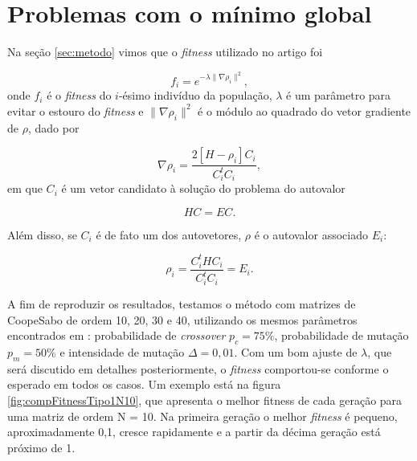 \section{Problemas com o mínimo global}	
	
	Na seção \ref{sec:metodo} vimos que o \textit{fitness} utilizado no artigo \cite{metodo2004}  foi
	
	\begin{equation}
		\label{eq:fitnessGrad2}
		f_i = e^{-\lambda \| \nabla \rho_i \|^2},
	\end{equation}
	onde $f_i$ é o \textit{fitness} do $i$-ésimo indivíduo da população, $\lambda$ é um parâmetro para evitar o estouro do \textit{fitness} e $\| \nabla \rho_i\|^2$ é o módulo ao quadrado do vetor gradiente de $\rho$, dado por
		
				\begin{equation}
					\nabla \rho_i = \frac{2[H - \rho_i]C_i}{C_i^t C_i},
				\end{equation}
	em que $C_i$ é um vetor candidato à solução do problema do autovalor
	
	\begin{equation}
		HC = EC.
	\end{equation}
	
	Além disso, se $C_i$ é de fato um dos autovetores, $\rho$ é o autovalor associado $E_i$:
	
	\begin{equation}\label{eq:rho_eh_E}
		\rho_i = \frac{C_i^t H C_i}{C_i^t C_i} = E_i.
	\end{equation}
	
	A fim de reproduzir os resultados, testamos o método com matrizes de Coope\-Sabo de ordem 10, 20, 30 e 40, utilizando os mesmos parâmetros encontrados em \cite{metodo2004}: probabilidade de \textit{crossover} $p_c = 75\%$, probabilidade de mutação $p_m = 50\%$ e intensidade de mutação $\Delta = 0,01$. Com um bom ajuste de $\lambda$, que será discutido em detalhes posteriormente, o \textit{fitness} comportou-se conforme o esperado em todos os casos. Um exemplo está na figura \ref{fig:compFitnessTipo1N10}, que apresenta o melhor fitness de cada geração para uma matriz de ordem N = 10. Na primeira geração o melhor \textit{fitness} é pequeno, aproximadamente 0,1, cresce rapidamente e a partir da décima geração está próximo de 1.
	

